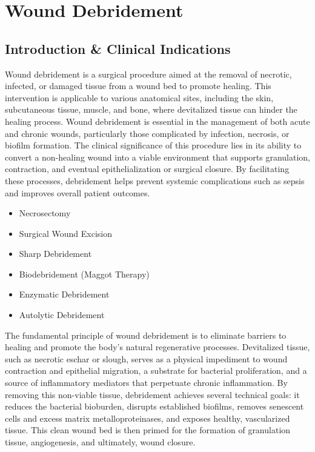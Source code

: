 \chapter{Wound Debridement}

\section*{Introduction \& Clinical Indications}
Wound debridement is a surgical procedure aimed at the removal of necrotic, infected, or damaged tissue from a wound bed to promote healing. This intervention is applicable to various anatomical sites, including the skin, subcutaneous tissue, muscle, and bone, where devitalized tissue can hinder the healing process. Wound debridement is essential in the management of both acute and chronic wounds, particularly those complicated by infection, necrosis, or biofilm formation. The clinical significance of this procedure lies in its ability to convert a non-healing wound into a viable environment that supports granulation, contraction, and eventual epithelialization or surgical closure. By facilitating these processes, debridement helps prevent systemic complications such as sepsis and improves overall patient outcomes.

\begin{itemize}
  \item Necrosectomy
  \item Surgical Wound Excision
  \item Sharp Debridement
  \item Biodebridement (Maggot Therapy)
  \item Enzymatic Debridement
  \item Autolytic Debridement
\end{itemize}

The fundamental principle of wound debridement is to eliminate barriers to healing and promote the body's natural regenerative processes. Devitalized tissue, such as necrotic eschar or slough, serves as a physical impediment to wound contraction and epithelial migration, a substrate for bacterial proliferation, and a source of inflammatory mediators that perpetuate chronic inflammation. By removing this non-viable tissue, debridement achieves several technical goals: it reduces the bacterial bioburden, disrupts established biofilms, removes senescent cells and excess matrix metalloproteinases, and exposes healthy, vascularized tissue. This clean wound bed is then primed for the formation of granulation tissue, angiogenesis, and ultimately, wound closure.

